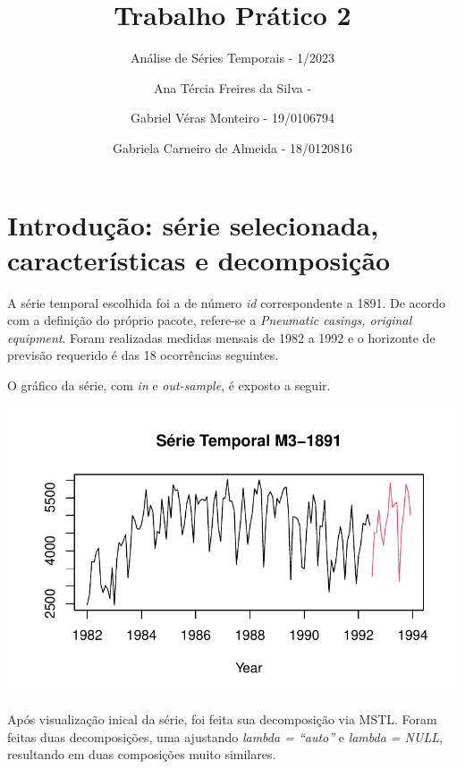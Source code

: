 \documentclass[
  letterpaper,
  DIV=11,
  numbers=noendperiod]{scrartcl}
\title{Trabalho Prático 2}
\subtitle{Análise de Séries Temporais - 1/2023}
\author{Ana Tércia Freires da Silva - \and Gabriel Véras Monteiro -
19/0106794 \and Gabriela Carneiro de Almeida - 18/0120816}
\date{}
\renewcommand*\contentsname{Table of contents}
\newcommand\contentsname{Table of contents}
\begin{document}
\maketitle
\ifdefined\Shaded\renewenvironment{Shaded}{\begin{tcolorbox}[interior hidden, sharp corners, breakable, boxrule=0pt, enhanced, borderline west={3pt}{0pt}{shadecolor}, frame hidden]}{\end{tcolorbox}}\fi

\renewcommand*\contentsname{Table of contents}
{
\hypersetup{linkcolor=}
\setcounter{tocdepth}{3}
\tableofcontents
}
\newpage{}

\hypertarget{introduuxe7uxe3o-suxe9rie-selecionada-caracteruxedsticas-e-decomposiuxe7uxe3o}{%
\section{Introdução: série selecionada, características e
decomposição}\label{introduuxe7uxe3o-suxe9rie-selecionada-caracteruxedsticas-e-decomposiuxe7uxe3o}}

A série temporal escolhida foi a de número \emph{id} correspondente a
1891. De acordo com a definição do próprio pacote, refere-se a
\emph{Pneumatic casings, original equipment}. Foram realizadas medidas
mensais de 1982 a 1992 e o horizonte de previsão requerido é das 18
ocorrências seguintes.

O gráfico da série, com \emph{in} e \emph{out-sample}, é exposto a
seguir.

\includegraphics{T2_grupo10_files/figure-pdf/plot-serie-total-1.pdf}

Após visualização inical da série, foi feita sua decomposição via MSTL.
Foram feitas duas decomposições, uma ajustando \emph{lambda = ``auto''}
e \emph{lambda = NULL}, resultando em duas composições muito similares.
\end{document}
